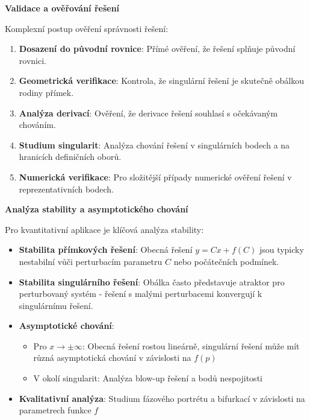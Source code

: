 \vspace{1\baselineskip}

\noindent\textbf{Validace a ověřování řešení}

Komplexní postup ověření správnosti řešení:

\begin{enumerate}
\item \textbf{Dosazení do původní rovnice}: Přímé ověření, že řešení splňuje původní rovnici.

\item \textbf{Geometrická verifikace}: Kontrola, že singulární řešení je skutečně obálkou rodiny přímek.

\item \textbf{Analýza derivací}: Ověření, že derivace řešení souhlasí s očekávaným chováním.

\item \textbf{Studium singularit}: Analýza chování řešení v singulárních bodech a na hranicích definičních oborů.

\item \textbf{Numerická verifikace}: Pro složitější případy numerické ověření řešení v reprezentativních bodech.
\end{enumerate}

\vspace{1\baselineskip}

\noindent\textbf{Analýza stability a asymptotického chování}

Pro kvantitativní aplikace je klíčová analýza stability:

\begin{itemize}
\item \textbf{Stabilita přímkových řešení}: Obecná řešení $y = Cx + f(C)$ jsou typicky nestabilní vůči perturbacím parametru $C$ nebo počátečních podmínek.

\item \textbf{Stabilita singulárního řešení}: Obálka často představuje atraktor pro perturbovaný systém - řešení s malými perturbacemi konvergují k singulárnímu řešení.

\item \textbf{Asymptotické chování}: 
\begin{itemize}
\item Pro $x \to \pm\infty$: Obecná řešení rostou lineárně, singulární řešení může mít různá asymptotická chování v závislosti na $f(p)$
\item V okolí singularit: Analýza blow-up řešení a bodů nespojitosti
\end{itemize}

\item \textbf{Kvalitativní analýza}: Studium fázového portrétu a bifurkací v závislosti na parametrech funkce $f$
\end{itemize}

